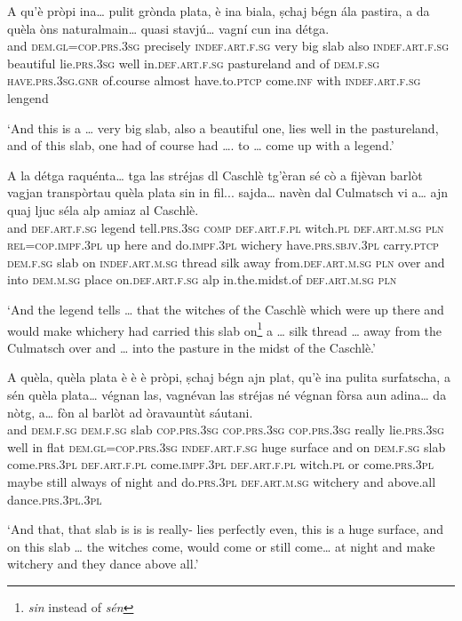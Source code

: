 \begin{linenumbers}
\gll    A qu’è pròpi ina… pulit grònda plata, è ina biala, ṣchaj bégn ála pastira, a da quèla òns naturalmain… quasi stavjú… vagní cun ina détga.\\
 and \textsc{dem.gl=cop.prs.3sg} precisely \textsc{indef.art.f.sg} very big slab also \textsc{indef.art.f.sg} beautiful lie.\textsc{prs.3sg} well  in.\textsc{def.art.f.sg} pastureland and of \textsc{dem.f.sg} \textsc{have.prs.3sg.gnr} of.course almost have.to.\textsc{ptcp}  come.\textsc{inf} with \textsc{indef.art.f.sg} lengend\\
\end{linenumbers}
\medskip
\glt `And this is a … very big slab, also a beautiful one, lies well in the pastureland, and of this slab, one had of course had …. to … come up with a legend.'
\medskip

\begin{linenumbers}
\gll    A la détga raquénta… tga las stréjas dl Caschlè tg’èran sé cò a fijèvan barlòt vagjan transpòrtau quèla plata sin in fil... sajda… navèn dal Culmatsch vi a… ajn quaj ljuc séla alp amiaz al Caschlè.\\
and \textsc{def.art.f.sg} legend tell.\textsc{prs.3sg} \textsc{comp} \textsc{def.art.f.pl} witch.\textsc{pl} \textsc{def.art.m.sg} \textsc{pln} \textsc{rel=cop.impf.3pl} up here and do.\textsc{impf.3pl} wichery have.\textsc{prs.sbjv.3pl} carry.\textsc{ptcp} \textsc{dem.f.sg} slab on \textsc{indef.art.m.sg} thread silk away from.\textsc{def.art.m.sg} \textsc{pln} over and  into \textsc{dem.m.sg} place on.\textsc{def.art.f.sg} alp in.the.midst.of \textsc{def.art.m.sg} \textsc{pln}\\
\end{linenumbers}
\medskip
\glt `And the legend tells … that the witches of the Caschlè which were up there and would make whichery had carried this slab on\footnote{\textit{sin} instead of \textit{sén}} a … silk thread … away from the Culmatsch over and … into the pasture in the midst of the Caschlè.'
\medskip

\begin{linenumbers}
\gll    A quèla, quèla plata è è è pròpi, ṣchaj bégn ajn plat, qu’è ina pulita surfatscha, a sén quèla plata… végnan las, vagnévan las stréjas né végnan fòrsa aun adina… da nòtg, a… fòn al barlòt ad òravauntùt sáutani.
\\
and \textsc{dem.f.sg} \textsc{dem.f.sg} slab \textsc{cop.prs.3sg} \textsc{cop.prs.3sg} \textsc{cop.prs.3sg} really lie.\textsc{prs.3sg} well in flat \textsc{dem.gl=cop.prs.3sg} \textsc{indef.art.f.sg} huge surface and on \textsc{dem.f.sg} slab come.\textsc{prs.3pl}   \textsc{def.art.f.pl} come.\textsc{impf.3pl} \textsc{def.art.f.pl} witch.\textsc{pl} or come.\textsc{prs.3pl} maybe still always of night and do.\textsc{prs.3pl} \textsc{def.art.m.sg} witchery and above.all dance.\textsc{prs.3pl.3pl}\\
\end{linenumbers}
\medskip
\glt `And that, that slab is is is really- lies perfectly even, this is a huge surface, and on this slab … the witches come, would come or still come… at night and make witchery and they dance above all.'
\medskip

